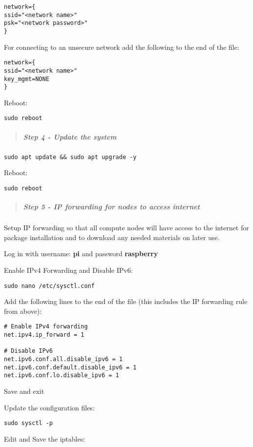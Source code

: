 \documentclass[]{article}
\let\oldsubparagraph\subparagraph
\renewcommand{\subparagraph}[1]{\oldsubparagraph{#1}\mbox{}}
\begin{document}
\begin{verbatim}
network={
ssid="<network name>"
psk="<network password>"
}
\end{verbatim}

For connecting to an unsecure network add the following to the end of
the file:

\begin{verbatim}
network={
ssid="<network name>"
key_mgmt=NONE
}
\end{verbatim}

Reboot:

\texttt{sudo\ reboot}

\begin{quote}
\mbox{}%
\subparagraph{Step 4 - Update the
system}\label{step-4---update-the-system}
\end{quote}

\texttt{sudo\ apt\ update\ \&\&\ sudo\ apt\ upgrade\ -y}

Reboot:

\texttt{sudo\ reboot}

\begin{quote}
\mbox{}%
\subparagraph{Step 5 - IP forwarding for nodes to access
internet}\label{step-5---ip-forwarding-for-nodes-to-access-internet}
\end{quote}

Setup IP forwarding so that all compute nodes will have access to the
internet for package installation and to download any needed materials
on later use.

Log in with username: \textbf{pi} and password \textbf{raspberry}

Enable IPv4 Forwarding and Disable IPv6:

\texttt{sudo\ nano\ /etc/sysctl.conf}

Add the following lines to the end of the file (this includes the IP
forwarding rule from above):

\begin{verbatim}
# Enable IPv4 forwarding
net.ipv4.ip_forward = 1

# Disable IPv6
net.ipv6.conf.all.disable_ipv6 = 1
net.ipv6.conf.default.disable_ipv6 = 1
net.ipv6.conf.lo.disable_ipv6 = 1
\end{verbatim}

Save and exit

Update the configuration files:

\texttt{sudo\ sysctl\ -p}

Edit and Save the iptables:
\end{document}
